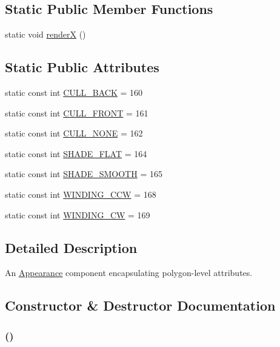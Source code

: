 \subsection*{Static Public Member Functions}
\begin{CompactItemize}
\item 
static void \hyperlink{classm3g_1_1PolygonMode_443a7a301f77f625335ecc06d13bad06}{renderX} ()
\end{CompactItemize}
\subsection*{Static Public Attributes}
\begin{CompactItemize}
\item 
static const int \hyperlink{classm3g_1_1PolygonMode_34ae9162b765ddbc1d2476edf3195361}{CULL\_\-BACK} = 160
\item 
static const int \hyperlink{classm3g_1_1PolygonMode_efa180528b010979c6f7732c3c3114ae}{CULL\_\-FRONT} = 161
\item 
static const int \hyperlink{classm3g_1_1PolygonMode_48717ad405f481d0f2ab8e948bf86822}{CULL\_\-NONE} = 162
\item 
static const int \hyperlink{classm3g_1_1PolygonMode_5da32249eba3f6eb4366f016c424099e}{SHADE\_\-FLAT} = 164
\item 
static const int \hyperlink{classm3g_1_1PolygonMode_2da5e6696c8e910d9fca74b583a081df}{SHADE\_\-SMOOTH} = 165
\item 
static const int \hyperlink{classm3g_1_1PolygonMode_98d881cf813edf483860268535014210}{WINDING\_\-CCW} = 168
\item 
static const int \hyperlink{classm3g_1_1PolygonMode_86975b3dec0d6cc20f54fd82eb13ef9e}{WINDING\_\-CW} = 169
\end{CompactItemize}


\subsection{Detailed Description}
An \hyperlink{classm3g_1_1Appearance}{Appearance} component encapsulating polygon-level attributes. 

\subsection{Constructor \& Destructor Documentation}
\hypertarget{classm3g_1_1PolygonMode_b089ee808cbc4799bb2e92dd4ca554c3}{
\subsubsection[{PolygonMode}]{ ()}}
\label{classm3g_1_1PolygonMode_b089ee808cbc4799bb2e92dd4ca554c3}


